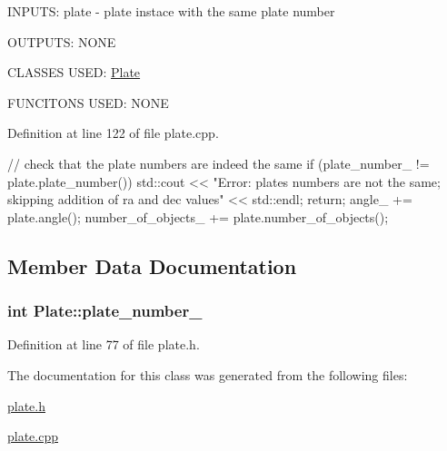 I\-N\-P\-U\-T\-S\-: plate -\/ plate instace with the same plate number

O\-U\-T\-P\-U\-T\-S\-: N\-O\-N\-E

C\-L\-A\-S\-S\-E\-S U\-S\-E\-D\-: \hyperlink{class_plate}{Plate}

F\-U\-N\-C\-I\-T\-O\-N\-S U\-S\-E\-D\-: N\-O\-N\-E

Definition at line 122 of file plate.\-cpp.


\begin{DoxyCode}
                                               {
    // check that the plate numbers are indeed the same
    if (plate_number_ != plate.plate_number()){
        std::cout << "Error: plates numbers are not the same; skipping addition
       of ra and dec values" << std::endl;
        return;
    }
    angle_ += plate.angle();
    number_of_objects_ += plate.number_of_objects();
}
\end{DoxyCode}


\subsection{Member Data Documentation}
\hypertarget{class_plate_a3ff23f95b9f615a470a315cadc2b8940}{
\subsubsection[{plate\-\_\-number\-\_\-}]{\setlength{\rightskip}{0pt plus 5cm}int {\bf Plate\-::plate\-\_\-number\-\_\-}}}\label{class_plate_a3ff23f95b9f615a470a315cadc2b8940}


Definition at line 77 of file plate.\-h.



The documentation for this class was generated from the following files\-:\begin{DoxyCompactItemize}
\item 
\hyperlink{plate_8h}{plate.\-h}\item 
\hyperlink{plate_8cpp}{plate.\-cpp}\end{DoxyCompactItemize}
